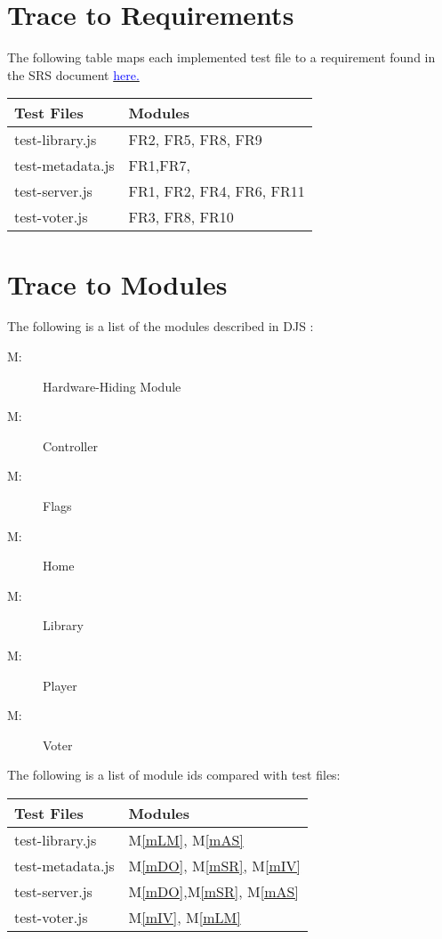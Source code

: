 \documentclass[12pt, titlepage]{article}
\newcounter{mnum}
\newcommand{\mthemnum}{M\themnum}
\newcommand{\mref}[1]{M\ref{#1}}
\begin{document}
\section{Trace to Requirements}
The following table maps each implemented test file to a requirement found in the SRS document \href{run:../../Doc/SRS/SRS.pdf}{\textcolor{blue}{here.}}
\begin{table}[H]
\centering
\begin{tabular}{p{} p{}}
\toprule
\textbf{Test Files} & \textbf{Modules}\\
\midrule
test-library.js & FR2, FR5, FR8, FR9\\
test-metadata.js & FR1,FR7,\\
test-server.js & FR1, FR2, FR4, FR6, FR11\\
test-voter.js & FR3, FR8, FR10\\

\bottomrule
\end{tabular}

\label{TblRT}
\end{table}
\section{Trace to Modules}
The following is a list of the modules described in DJS :
\begin{description}
\item [ \mthemnum \label{mHH}:] Hardware-Hiding Module
\item [ \mthemnum \label{mSR}:] Controller
\item [ \mthemnum \label{mAS}:] Flags
\item [ \mthemnum \label{mDO}:] Home
\item [ \mthemnum \label{mLM}:] Library
\item [ \mthemnum \label{mPM}:] Player
\item [ \mthemnum \label{mIV}:] Voter
\end{description}
The following is a list of module ids compared with test files:
\begin{table}[H]
\centering
\begin{tabular}{p{} p{}}
\toprule
\textbf{Test Files} & \textbf{Modules}\\
\midrule
test-library.js & \mref{mLM}, \mref{mAS}\\
test-metadata.js & \mref{mDO}, \mref{mSR}, \mref{mIV}\\
test-server.js & \mref{mDO},\mref{mSR}, \mref{mAS}\\
test-voter.js & \mref{mIV}, \mref{mLM} \\

\bottomrule
\end{tabular}

\label{TblRT}
\end{table}
\end{document}
